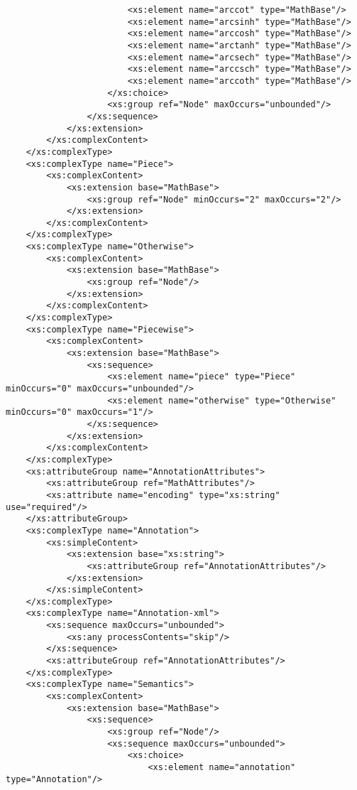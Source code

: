 \begin{footnotesize}
\begin{verbatim}
                        <xs:element name="arccot" type="MathBase"/>
                        <xs:element name="arcsinh" type="MathBase"/>
                        <xs:element name="arccosh" type="MathBase"/>
                        <xs:element name="arctanh" type="MathBase"/>
                        <xs:element name="arcsech" type="MathBase"/>
                        <xs:element name="arccsch" type="MathBase"/>
                        <xs:element name="arccoth" type="MathBase"/>
                    </xs:choice>
                    <xs:group ref="Node" maxOccurs="unbounded"/>
                </xs:sequence>
            </xs:extension>
        </xs:complexContent>
    </xs:complexType>
    <xs:complexType name="Piece">
        <xs:complexContent>
            <xs:extension base="MathBase">
                <xs:group ref="Node" minOccurs="2" maxOccurs="2"/>
            </xs:extension>
        </xs:complexContent>
    </xs:complexType>
    <xs:complexType name="Otherwise">
        <xs:complexContent>
            <xs:extension base="MathBase">
                <xs:group ref="Node"/>
            </xs:extension>
        </xs:complexContent>
    </xs:complexType>
    <xs:complexType name="Piecewise">
        <xs:complexContent>
            <xs:extension base="MathBase">
                <xs:sequence>
                    <xs:element name="piece" type="Piece" minOccurs="0" maxOccurs="unbounded"/>
                    <xs:element name="otherwise" type="Otherwise" minOccurs="0" maxOccurs="1"/>
                </xs:sequence>
            </xs:extension>
        </xs:complexContent>
    </xs:complexType>
    <xs:attributeGroup name="AnnotationAttributes">
        <xs:attributeGroup ref="MathAttributes"/>
        <xs:attribute name="encoding" type="xs:string" use="required"/>
    </xs:attributeGroup>
    <xs:complexType name="Annotation">
        <xs:simpleContent>
            <xs:extension base="xs:string">
                <xs:attributeGroup ref="AnnotationAttributes"/>
            </xs:extension>
        </xs:simpleContent>
    </xs:complexType>
    <xs:complexType name="Annotation-xml">
        <xs:sequence maxOccurs="unbounded">
            <xs:any processContents="skip"/>
        </xs:sequence>
        <xs:attributeGroup ref="AnnotationAttributes"/>
    </xs:complexType>
    <xs:complexType name="Semantics">
        <xs:complexContent>
            <xs:extension base="MathBase">
                <xs:sequence>
                    <xs:group ref="Node"/>
                    <xs:sequence maxOccurs="unbounded">
                        <xs:choice>
                            <xs:element name="annotation" type="Annotation"/>

\end{verbatim}
\end{footnotesize}
